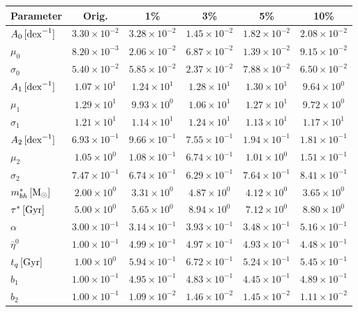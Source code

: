 \begin{table}[h!]
\centering
\small
\begin{tabular}{lccccc}
\hline
\textbf{Parameter} & \textbf{Orig.} & \textbf{1\%} & \textbf{3\%} & \textbf{5\%} & \textbf{10\%} \\
\hline
$A_{0}\,[{\rm dex}^{-1}]$ & $3.30\times10^{-2}$ & $3.28\times10^{-2}$ & $1.45\times10^{-2}$ & $1.82\times10^{-2}$ & $2.08\times10^{-2}$ \\
$\mu_{0}$ & $8.20\times10^{-3}$ & $2.06\times10^{-2}$ & $6.87\times10^{-2}$ & $1.39\times10^{-2}$ & $9.15\times10^{-2}$ \\
$\sigma_{0}$ & $5.40\times10^{-2}$ & $5.85\times10^{-2}$ & $2.37\times10^{-2}$ & $7.88\times10^{-2}$ & $6.50\times10^{-2}$ \\
$A_{1}\,[{\rm dex}^{-1}]$ & $1.07\times10^{1}$ & $1.24\times10^{1}$ & $1.28\times10^{1}$ & $1.30\times10^{1}$ & $9.64\times10^{0}$ \\
$\mu_{1}$ & $1.29\times10^{1}$ & $9.93\times10^{0}$ & $1.06\times10^{1}$ & $1.27\times10^{1}$ & $9.72\times10^{0}$ \\
$\sigma_{1}$ & $1.21\times10^{1}$ & $1.14\times10^{1}$ & $1.24\times10^{1}$ & $1.13\times10^{1}$ & $1.17\times10^{1}$ \\
$A_{2}\,[{\rm dex}^{-1}]$ & $6.93\times10^{-1}$ & $9.66\times10^{-1}$ & $7.55\times10^{-1}$ & $1.94\times10^{-1}$ & $1.81\times10^{-1}$ \\
$\mu_{2}$ & $1.05\times10^{0}$ & $1.08\times10^{-1}$ & $6.74\times10^{-1}$ & $1.01\times10^{0}$ & $1.51\times10^{-1}$ \\
$\sigma_{2}$ & $7.47\times10^{-1}$ & $6.74\times10^{-1}$ & $6.29\times10^{-1}$ & $7.64\times10^{-1}$ & $8.41\times10^{-1}$ \\
$m_{bh}^{*}\,[{\rm M}_{\odot}]$ & $2.00\times10^{0}$ & $3.31\times10^{0}$ & $4.87\times10^{0}$ & $4.12\times10^{0}$ & $3.65\times10^{0}$ \\
$\tau^{*}\,[{\rm Gyr}]$ & $5.00\times10^{0}$ & $5.65\times10^{0}$ & $8.94\times10^{0}$ & $7.12\times10^{0}$ & $8.80\times10^{0}$ \\
$\alpha$ & $3.00\times10^{-1}$ & $3.14\times10^{-1}$ & $3.93\times10^{-1}$ & $3.48\times10^{-1}$ & $5.16\times10^{-1}$ \\
$\bar{\eta}^{0}$ & $1.00\times10^{-1}$ & $4.99\times10^{-1}$ & $4.97\times10^{-1}$ & $4.93\times10^{-1}$ & $4.48\times10^{-1}$ \\
$t_q\,[{\rm Gyr}]$ & $1.00\times10^{0}$ & $5.94\times10^{-1}$ & $6.72\times10^{-1}$ & $5.24\times10^{-1}$ & $5.45\times10^{-1}$ \\
$b_{1}$ & $1.00\times10^{-1}$ & $4.95\times10^{-1}$ & $4.83\times10^{-1}$ & $4.45\times10^{-1}$ & $4.89\times10^{-1}$ \\
$b_{2}$ & $1.00\times10^{-1}$ & $1.09\times10^{-2}$ & $1.46\times10^{-2}$ & $1.45\times10^{-2}$ & $1.11\times10^{-2}$ \\
\hline
\end{tabular}


\end{table}

